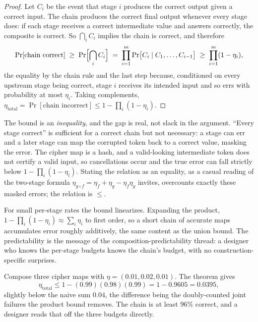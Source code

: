 \begin{proof}
Let $C_i$ be the event that stage $i$ produces the correct output given a
correct input. The chain produces the correct final output whenever every
stage does: if each stage receives a correct intermediate value and answers
correctly, the composite is correct. So $\bigcap_{i} C_i$ implies the chain
is correct, and therefore
\[
  \Pr[\text{chain correct}] \;\geq\; \Pr\Bigl[\bigcap_{i} C_i\Bigr]
  \;=\; \prod_{i=1}^{m} \Pr\bigl[C_i \mid C_1, \ldots, C_{i-1}\bigr]
  \;\geq\; \prod_{i=1}^{m} (1 - \eta_i),
\]
the equality by the chain rule and the last step because, conditioned on
every upstream stage being correct, stage $i$ receives its intended input
and so errs with probability at most $\eta_i$. Taking complements,
$\eta_{\mathrm{total}} = \Pr[\text{chain incorrect}] \leq 1 - \prod_i (1 -
\eta_i)$.
\end{proof}

The bound is an \emph{inequality}, and the gap is real, not slack in the
argument. ``Every stage correct'' is sufficient for a correct chain but not
necessary: a stage can err and a later stage can map the corrupted token
back to a correct value, masking the error. The cipher map is a hash, and a
valid-looking intermediate token does not certify a valid input, so
cancellations occur and the true error can fall strictly below
$1 - \prod_i(1 - \eta_i)$. Stating the relation as an equality, as a casual
reading of the two-stage formula
$\eta_{g \circ f} = \eta_f + \eta_g - \eta_f \eta_g$ invites, overcounts
exactly these masked errors; the relation is $\leq$.

For small per-stage rates the bound linearizes. Expanding the product,
$1 - \prod_i(1 - \eta_i) \approx \sum_i \eta_i$ to first order, so a short
chain of accurate maps accumulates error roughly additively, the same
content as the union bound. The predictability is the message of the
composition-predictability thread: a designer who knows the per-stage
budgets knows the chain's budget, with no construction-specific surprises.

\begin{example}
\label{ex:composition}
Compose three cipher maps with $\eta = (0.01, 0.02, 0.01)$. The theorem
gives
\[
  \eta_{\mathrm{total}} \leq 1 - (0.99)(0.98)(0.99) = 1 - 0.9605 = 0.0395,
\]
slightly below the naive sum $0.04$, the difference being the
doubly-counted joint failures the product bound removes. The chain is at
least $96\%$ correct, and a designer reads that off the three budgets
directly.
\end{example}

